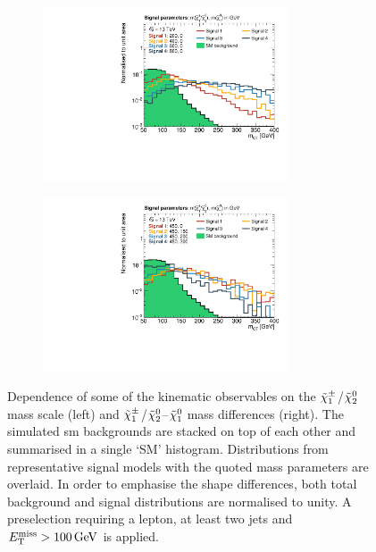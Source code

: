 \begin{figure}
\begin{subfigure}[b]{0.5\linewidth}
	\end{subfigure}\hfill
	\par\medskip
	\begin{subfigure}[b]{0.5\linewidth}
		\centering\includegraphics[width=0.8\textwidth]{high_mass/mct}
	\end{subfigure}\hfill
	\begin{subfigure}[b]{0.5\linewidth}
		\centering\includegraphics[width=0.8\textwidth]{mass_diff/mct}
	\end{subfigure}

	\caption{Dependence of some of the kinematic observables on the \mbox{$\tilde{\chi}_1^\pm$/$\tilde{\chi}_2^0$} mass scale (left) and \mbox{$\tilde{\chi}_1^\pm$/$\tilde{\chi}_2^0$}--$\tilde{\chi}_1^0$ mass differences (right). The simulated \gls{sm} backgrounds are stacked on top of each other and summarised in a single `SM' histogram. Distributions from representative signal models with the quoted mass parameters are overlaid. In order to emphasise the shape differences, both total background and signal distributions are normalised to unity. A preselection requiring a lepton, at least two jets and $\etmiss > \SI{100}{\GeV}$ is applied.}\label{fig:norm_obs_app}
\end{figure}

